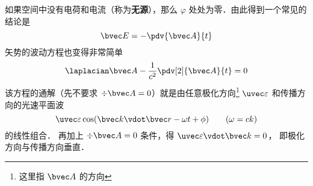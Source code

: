 如果空间中没有电荷和电流（称为\textbf{无源}），那么 $\varphi$ 处处为零．由此得到一个常见的结论是
\begin{equation}\label{Cgauge_eq2}
\bvec E = - \pdv{\bvec A}{t}
\end{equation}
矢势的波动方程也变得非常简单
\begin{equation}
\laplacian \bvec A - \frac{1}{c^2} \pdv[2]{\bvec A}{t} = 0
\end{equation}
该方程的通解（先不要求 $\div \bvec A = 0$）就是由任意极化方向\footnote{这里指 $\bvec A$ 的方向} $\uvec \varepsilon$ 和传播方向的光速平面波
\begin{equation}
\uvec \varepsilon \cos(\bvec k \vdot \bvec r - \omega t + \phi) \qquad (\omega = ck)
\end{equation}
的线性组合． 再加上 $\div \bvec A = 0$ 条件，得 $\uvec \varepsilon \vdot \bvec k = 0$， 即极化方向与传播方向垂直．
